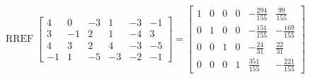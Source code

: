 \begin{exerciseAnswer} 


\[\operatorname{RREF} \left[\begin{array}{cccccc}
4 & 0 & -3 & 1 & -3 & -1 \\
3 & -1 & 2 & 1 & -4 & 3 \\
4 & 3 & 2 & 4 & -3 & -5 \\
-1 & 1 & -5 & -3 & -2 & -1
\end{array}\right] = \left[\begin{array}{cccccc}
1 & 0 & 0 & 0 & -\frac{294}{155} & \frac{99}{155} \\
0 & 1 & 0 & 0 & -\frac{151}{155} & -\frac{169}{155} \\
0 & 0 & 1 & 0 & -\frac{24}{31} & \frac{22}{31} \\
0 & 0 & 0 & 1 & \frac{351}{155} & -\frac{221}{155}
\end{array}\right] \]



\end{exerciseAnswer}
